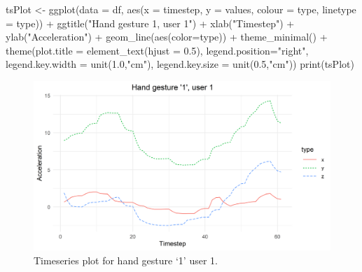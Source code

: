 \documentclass[
  11pt,
]{krantz}
\newenvironment{Shaded}{\begin{snugshade}}{\end{snugshade}}
\newcommand{\AttributeTok}[1]{\textcolor[rgb]{0.61,0.61,0.61}{#1}}
\newcommand{\FloatTok}[1]{\textcolor[rgb]{0.06,0.06,0.06}{#1}}
\newcommand{\FunctionTok}[1]{\textcolor[rgb]{0,0,0}{#1}}
\newcommand{\NormalTok}[1]{#1}
\newcommand{\OtherTok}[1]{\textcolor[rgb]{0.37,0.37,0.37}{#1}}
\newcommand{\SpecialCharTok}[1]{\textcolor[rgb]{0,0,0}{#1}}
\newcommand{\StringTok}[1]{\textcolor[rgb]{0.5,0.5,0.5}{#1}}
\begin{document}
\begin{Shaded}
\begin{Highlighting}[]
\NormalTok{tsPlot }\OtherTok{\textless{}{-}} \FunctionTok{ggplot}\NormalTok{(}\AttributeTok{data =}\NormalTok{ df,}
                   \FunctionTok{aes}\NormalTok{(}\AttributeTok{x =}\NormalTok{ timestep,}
                       \AttributeTok{y =}\NormalTok{ values,}
                       \AttributeTok{colour =}\NormalTok{ type,}
                       \AttributeTok{linetype =}\NormalTok{ type)) }\SpecialCharTok{+}
  \FunctionTok{ggtitle}\NormalTok{(}\StringTok{"Hand gesture \textquotesingle{}1\textquotesingle{}, user 1"}\NormalTok{) }\SpecialCharTok{+}
  \FunctionTok{xlab}\NormalTok{(}\StringTok{"Timestep"}\NormalTok{) }\SpecialCharTok{+}
  \FunctionTok{ylab}\NormalTok{(}\StringTok{"Acceleration"}\NormalTok{) }\SpecialCharTok{+}
  \FunctionTok{geom\_line}\NormalTok{(}\FunctionTok{aes}\NormalTok{(}\AttributeTok{color=}\NormalTok{type)) }\SpecialCharTok{+}
  \FunctionTok{theme\_minimal}\NormalTok{() }\SpecialCharTok{+}
  \FunctionTok{theme}\NormalTok{(}\AttributeTok{plot.title =} \FunctionTok{element\_text}\NormalTok{(}\AttributeTok{hjust =} \FloatTok{0.5}\NormalTok{),}
        \AttributeTok{legend.position=}\StringTok{"right"}\NormalTok{,}
        \AttributeTok{legend.key.width =} \FunctionTok{unit}\NormalTok{(}\FloatTok{1.0}\NormalTok{,}\StringTok{"cm"}\NormalTok{),}
        \AttributeTok{legend.key.size =} \FunctionTok{unit}\NormalTok{(}\FloatTok{0.5}\NormalTok{,}\StringTok{"cm"}\NormalTok{))}
\FunctionTok{print}\NormalTok{(tsPlot)}
\end{Highlighting}
\end{Shaded}



\begin{figure}

{\centering \includegraphics[width=1\linewidth]{images/timeserieshand} 

}

\caption{Timeseries plot for hand gesture `1' user 1.}\label{fig:timeseriesGesture}
\end{figure}
\end{document}
